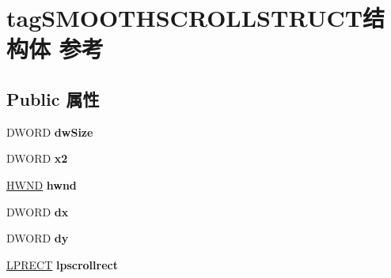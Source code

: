 \hypertarget{structtag_s_m_o_o_t_h_s_c_r_o_l_l_s_t_r_u_c_t}{}\section{tag\+S\+M\+O\+O\+T\+H\+S\+C\+R\+O\+L\+L\+S\+T\+R\+U\+C\+T结构体 参考}
\label{structtag_s_m_o_o_t_h_s_c_r_o_l_l_s_t_r_u_c_t}
\subsection*{Public 属性}
\begin{DoxyCompactItemize}
\item 
\mbox{\label{structtag_s_m_o_o_t_h_s_c_r_o_l_l_s_t_r_u_c_t_ab392d19e907aed926d4b24bfa5f0bd9f}} 
D\+W\+O\+RD {\bfseries dw\+Size}
\item 
\mbox{\label{structtag_s_m_o_o_t_h_s_c_r_o_l_l_s_t_r_u_c_t_a81956aa58962d9c562037a27e1f4365b}} 
D\+W\+O\+RD {\bfseries x2}
\item 
\mbox{\label{structtag_s_m_o_o_t_h_s_c_r_o_l_l_s_t_r_u_c_t_a4dc15a8910ce40ef77beb8573aad7d81}} 
\hyperlink{interfacevoid}{H\+W\+ND} {\bfseries hwnd}
\item 
\mbox{\label{structtag_s_m_o_o_t_h_s_c_r_o_l_l_s_t_r_u_c_t_aab13156a11f46657d5767c79031abdd2}} 
D\+W\+O\+RD {\bfseries dx}
\item 
\mbox{\label{structtag_s_m_o_o_t_h_s_c_r_o_l_l_s_t_r_u_c_t_a9091a9d67b45631571353b3f79d4a233}} 
D\+W\+O\+RD {\bfseries dy}
\item 
\mbox{\label{structtag_s_m_o_o_t_h_s_c_r_o_l_l_s_t_r_u_c_t_a8e1793e22e281a7e0f0548cfc77c1999}} 
\hyperlink{structtag_r_e_c_t}{L\+P\+R\+E\+CT} {\bfseries lpscrollrect}
\item 
\mbox{\label{structtag_s_m_o_o_t_h_s_c_r_o_l_l_s_t_r_u_c_t_a28e8e1c5f210a196248ee4082a7f5dea}} 

\end{DoxyCompactItemize}
